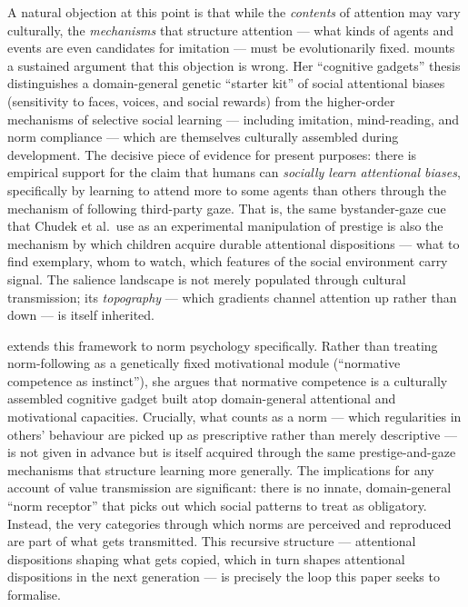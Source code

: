 A natural objection at this point is that while the \emph{contents} of attention
may vary culturally, the \emph{mechanisms} that structure attention — what kinds
of agents and events are even candidates for imitation — must be
evolutionarily fixed.
\citet{heyes2018CognitiveGadgets} mounts a sustained argument that this
objection is wrong.
Her ``cognitive gadgets'' thesis distinguishes a domain-general genetic
``starter kit'' of social attentional biases (sensitivity to faces, voices, and
social rewards) from the higher-order mechanisms of selective social learning
— including imitation, mind-reading, and norm compliance — which are themselves
culturally assembled during development.
The decisive piece of evidence for present purposes: there is empirical support
for the claim that humans can \emph{socially learn attentional biases},
specifically by learning to attend more to some agents than others through the
mechanism of following third-party gaze.
That is, the same bystander-gaze cue that Chudek et al.\ use as an experimental
manipulation of prestige is also the mechanism by which children acquire durable
attentional dispositions — what to find exemplary, whom to watch, which features
of the social environment carry signal.
The salience landscape is not merely populated through cultural transmission; its
\emph{topography} — which gradients channel attention up rather than down — is
itself inherited.

\citet{heyes2024NormPsychology} extends this framework to norm psychology
specifically.
Rather than treating norm-following as a genetically fixed motivational module
(``normative competence as instinct''), she argues that normative competence is a
culturally assembled cognitive gadget built atop domain-general attentional and
motivational capacities.
Crucially, what counts as a norm — which regularities in others' behaviour are
picked up as prescriptive rather than merely descriptive — is not given in
advance but is itself acquired through the same prestige-and-gaze mechanisms
that structure learning more generally.
The implications for any account of value transmission are significant: there is
no innate, domain-general ``norm receptor'' that picks out which social patterns
to treat as obligatory.
Instead, the very categories through which norms are perceived and reproduced
are part of what gets transmitted.
This recursive structure — attentional dispositions shaping what gets copied,
which in turn shapes attentional dispositions in the next generation — is
precisely the loop this paper seeks to formalise.

